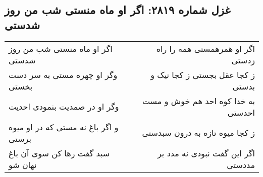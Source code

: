\begin{center}
\section*{غزل شماره ۲۸۱۹: اگر او ماه منستی شب من روز شدستی}
\label{sec:2819}
\begin{longtable}{l p{0.5cm} r}
اگر او ماه منستی شب من روز شدستی
&&
اگر او همرهمستی همه را راه زدستی
\\
وگر او چهره مستی به سر دست بخستی
&&
ز کجا عقل بجستی ز کجا نیک و بدستی
\\
وگر او در صمدیت بنمودی احدیت
&&
به خدا کوه احد هم خوش و مست احدستی
\\
و اگر باغ نه مستی که در او میوه برستی
&&
ز کجا میوه تازه به درون سبدستی
\\
سبد گفت رها کن سوی آن باغ نهان شو
&&
اگر این گفت نبودی نه مدد بر مددستی
\\
\end{longtable}
\end{center}
